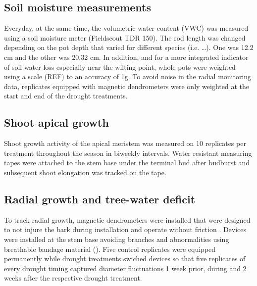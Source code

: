 \documentclass{article}
\begin{document}
	\subsection*{Soil moisture measurements}
Everyday, at the same time, the volumetric water content (VWC) was measured using a soil moisture meter (Fieldscout TDR 150). The rod length was changed depending on the pot depth that varied for different species (i.e. …). One was 12.2 cm and the other was 20.32 cm. In addition, and for a more integrated indicator of soil water loss especially near the wilting point, whole pots were weighted using a scale (REF) to an accuracy of 1g. To avoid noise in the radial monitoring data, replicates equipped with magnetic dendrometers were only weighted at the start and end of the drought treatments. %

	\subsection*{Shoot apical growth}
	Shoot growth activity of the apical meristem was measured on 10 replicates per treatment throughout the season in biweekly intervals. Water resistant measuring tapes were attached to the stem base under the terminal bud after budburst and subsequent shoot elongation was tracked on the tape.  \\

	\subsection*{Radial growth and tree-water deficit}
To track radial growth, magnetic dendrometers were installed that were designed to not injure the bark during installation and operate without friction \citep{clonchHighPrecisionZerofriction2021}. Devices were installed at the stem base avoiding branches and abnormalities using breathable bandage material (). Five control replicates were equipped permanently while drought treatments swiched devices so that five replicates of every drought timing captured diameter fluctuations 1 week prior, during and 2 weeks after the respective drought treatment. \\
\end{document}
